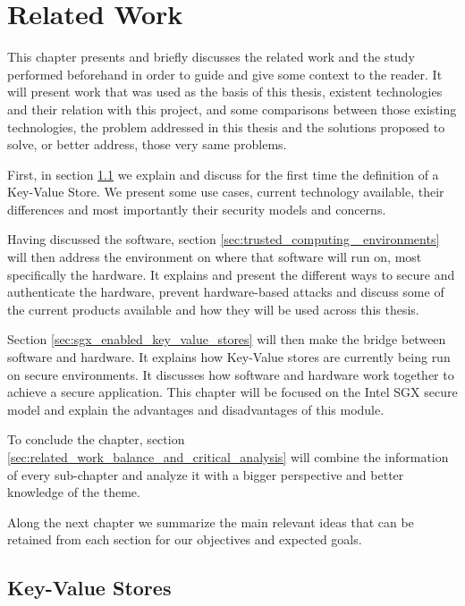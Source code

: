 \chapter{Related Work}
\label{cha:related_work}

This chapter presents and briefly discusses the related work and the study performed beforehand in order to guide and give some context to the reader. It will present work that was used as the basis of this thesis, existent technologies and their relation with this project, and some comparisons between those existing technologies, the problem addressed in this thesis and the solutions proposed to solve, or better address, those very same problems.

First, in section \ref{sec:key-value_stores} we explain and discuss for the first time the definition of a Key-Value Store. We present some use cases, current technology available, their differences and most importantly their security models and concerns.

Having discussed the software, section \ref{sec:trusted_computing _environments} will then address the environment on where that software will run on, most specifically the hardware. It explains and present the different ways to secure and authenticate the hardware, prevent hardware-based attacks and discuss some of the current products available and how they will be used across this thesis.

Section \ref{sec:sgx_enabled_key_value_stores} will then make the bridge between software and hardware. It explains how Key-Value stores are currently being run on secure environments. It discusses how software and hardware work together to achieve a secure application.
This chapter will be focused on the Intel SGX secure model and explain the advantages and disadvantages of this module.

To conclude the chapter, section \ref{sec:related_work_balance_and_critical_analysis} will combine the information of every sub-chapter and analyze it with a bigger perspective and better knowledge of the theme.

Along the next chapter we summarize the main relevant ideas that can be retained from each section for our objectives and expected goals.

\section{Key-Value Stores} %
\label{sec:key-value_stores}

